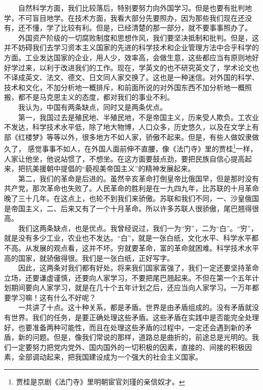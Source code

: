 \documentclass[cn,11pt,chinese]{elegantbook}
\begin{document}
　　自然科学方面，我们比较落后，特别要努力向外国学习。但是也要有批判地学，不可盲目地学。在技术方面，我看大部分先要照办，因为那些我们现在还没有，还不懂，学了比较有利。但是，已经清楚的那一部分，就不要事事照办了。\\
　　外国资产阶级的一切腐败制度和思想作风，我们要坚决抵制和批判。但是，这并不妨碍我们去学习资本主义国家的先进的科学技术和企业管理方法中合乎科学的方面。工业发达国家的企业，用人少，效率高，会做生意，这些都应当有原则地好好学过来，以利于改进我们的工作。现在，学英文的也不研究英文了，学术论文也不译成英文、法文、德文、日文同人家交换了。这也是一种迷信。对外国的科学、技术和文化，不加分析地一概排斥，和前面所说的对外国东西不加分析地一概照搬，都不是马克思主义的态度，都对我们的事业不利。\\
　　我认为，中国有两条缺点，同时又是两条优点。\\
　　第一，我国过去是殖民地、半殖民地，不是帝国主义，历来受人欺负。工农业不发达，科学技术水平低，除了地大物博，人口众多，历史悠久，以及在文学上有部《红楼梦》等等以外，很多地方不如人家，骄傲不起来。但是，有些人做奴隶做久了， 感觉事事不如人，在外国人面前伸不直腰，像《法门寺》里的贾桂\footnote[2]{ 贾桂是京剧《法门寺》里明朝宦官刘瑾的亲信奴才。}一样，人家让他坐，他说站惯了，不想坐。在这方面要鼓点劲，要把民族自信心提高起来，把抗美援朝中提倡的“藐视美帝国主义”的精神发展起来。\\
　　第二，我们的革命是后进的。虽然辛亥革命打倒皇帝比俄国早，但是那时没有共产党，那次革命也失败了。人民革命的胜利是在一九四九年，比苏联的十月革命晚了三十几年。在这点上，也轮不到我们来骄傲。苏联和我们不同，一、沙皇俄国是帝国主义，二、后来又有了一个十月革命。所以许多苏联人很骄傲，尾巴翘得很高。\\
　　我们这两条缺点，也是优点。我曾经说过，我们一为“穷”，二为“白”。“穷”，就是没有多少工业，农业也不发达。“白”，就是一张白纸，文化水平、科学水平都不高。从发展的观点看，这并不坏。穷就要革命，富的革命就困难。科学技术水平高的国家，就骄傲得很。我们是一张白纸，正好写字。\\
　　因此，这两条对我们都有好处。将来我们国家富强了，我们一定还要坚持革命立场，还要谦虚谨慎，还要向人家学习，不要把尾巴翘起来。不但在第一个五年计划期间要向人家学习，就是在几十个五年计划之后，还应当向人家学习。一万年都要学习嘛！这有什么不好呢？\\
　　一共讲了十点。这十种关系，都是矛盾。世界是由矛盾组成的。没有矛盾就没有世界。我们的任务，是要正确处理这些矛盾。这些矛盾在实践中是否能完全处理好，也要准备两种可能性，而且在处理这些矛盾的过程中，一定还会遇到新的矛盾，新的问题。但是，像我们常说的那样，道路总是曲折的，前途总是光明的。我们一定要努力把党内党外、国内国外的一切积极的因素，直接的、间接的积极因素，全部调动起来，把我国建设成为一个强大的社会主义国家。\\
\end{document}
